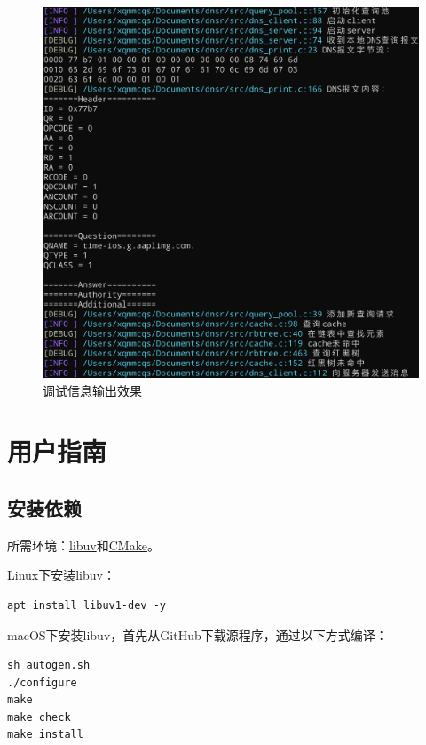 \documentclass[lang=cn,11pt,a4paper,cite=authornum]{paper}
\begin{document}
\begin{figure}[htbp]

    \centering
    \includegraphics[width=\linewidth]{./Images/log.png}
    \caption{调试信息输出效果\label{fig:log}}

\end{figure}

\section{用户指南}

\subsection{安装依赖}

所需环境：\href{https://github.com/libuv/libuv}{libuv}和\href{https://cmake.org/download/}{CMake}。

Linux下安装libuv：

\begin{code}
\begin{verbatim}
apt install libuv1-dev -y
\end{verbatim}
\end{code}

macOS下安装libuv，首先从GitHub下载源程序，通过以下方式编译：

\begin{code}
\begin{verbatim}
sh autogen.sh
./configure
make
make check
make install
\end{verbatim}
\end{code}
\end{document}
